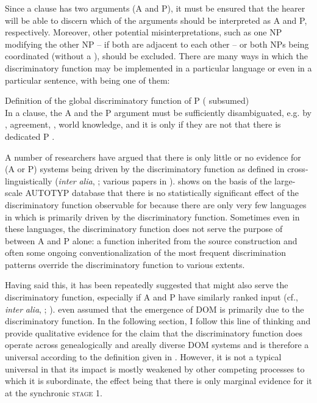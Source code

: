 \documentclass[output=paper]{langsci/langscibook}
\begin{document}
Since a  clause has two arguments (A and P), it must be ensured that the hearer will be able to discern which of the arguments should be interpreted as A and P, respectively. Moreover, other potential misinterpretations, such as one NP modifying the other NP – if both are adjacent to each other – or both NPs being coordinated (without a ), should be excluded. There are many ways in which the discriminatory function may be implemented in a particular language or even in a particular sentence, with  being one of them: 

\eanoraggedright\label{ex:serzant:3}
Definition of the global discriminatory function of P  ( subsumed)\\
In a  clause, the A and the P argument must be sufficiently disambiguated, e.g. by , agreement, , world knowledge, and it is only if they are not that there is dedicated P .
\z

A number of researchers have argued that there is only little or no evidence for (A or P)  systems being driven by the discriminatory function as defined in  cross-linguistically (\textit{inter} \textit{alia}, \citealt{Aissen2003,Malchukov2008}; various papers in \citealt{deHoopdeSwart2009}). \citet{Levshina2018_Effic} shows on the basis of the large-scale AUTOTYP database that there is no statistically significant effect of the discriminatory function observable for  because there are only very few languages in which  is primarily driven by the discriminatory function. Sometimes even in these languages, the discriminatory function does not serve the purpose of  between A and P alone: a function inherited from the source construction and often some ongoing conventionalization of the most frequent discrimination patterns override the discriminatory function to various extents. 

Having said this, it has been repeatedly suggested that  might also serve the discriminatory function, especially if A and P have similarly ranked input (cf., \textit{inter} \textit{alia}, \citealt{Comrie1978,Comrie1989}; \citealt{Dixon1994,Silverstein1976,Kibrik1997}). \citet[117]{Bossong1985} even assumed that the emergence of DOM is primarily due to the discriminatory function. In the following section, I follow this line of thinking and provide qualitative evidence for the claim that the discriminatory function does operate across genealogically and areally diverse DOM systems and is therefore a universal according to the definition given in . However, it is not a typical universal in that its impact is mostly weakened by other competing processes to which it is subordinate, the effect being that there is only marginal evidence for it at the synchronic \textsc{stage} 1.
\end{document}
